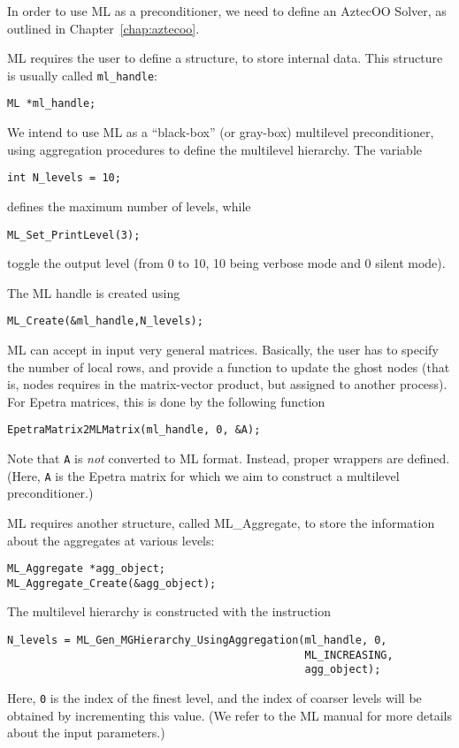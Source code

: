 In order to use ML as a preconditioner, we need to define an
AztecOO Solver, as outlined in Chapter~\ref{chap:aztecoo}. 

ML requires the user to define a structure, to store internal data. This
structure is usually called \verb!ml_handle!:
\begin{verbatim}
ML *ml_handle;
\end{verbatim}

We intend to use ML as a ``black-box'' (or gray-box) multilevel
preconditioner, using aggregation procedures to define the multilevel
hierarchy. The variable
\begin{verbatim}
int N_levels = 10;
\end{verbatim}
defines the maximum number of levels, while
\begin{verbatim}
ML_Set_PrintLevel(3);
\end{verbatim}
toggle the output level (from 0 to 10, 10 being verbose mode and 0
silent mode).

The ML handle is created using
\begin{verbatim}
ML_Create(&ml_handle,N_levels);
\end{verbatim}
ML can accept in input very general matrices. Basically, the user has to
specify the number of local rows, and provide a function to update the
ghost nodes (that is, nodes requires in the matrix-vector product, but
assigned to another process). For Epetra matrices, this is done by the
following function
\begin{verbatim}
EpetraMatrix2MLMatrix(ml_handle, 0, &A);
\end{verbatim}
Note that \verb!A! is {\sl not} converted to ML format. Instead, proper
wrappers are defined.  (Here, \verb!A! is the Epetra matrix for which we
aim to construct a multilevel preconditioner.)

ML requires another structure, called ML\_Aggregate, to store the
information about the aggregates at various levels:
\begin{verbatim}
ML_Aggregate *agg_object;
ML_Aggregate_Create(&agg_object);
\end{verbatim}

The multilevel hierarchy is constructed with the instruction
\begin{verbatim}
N_levels = ML_Gen_MGHierarchy_UsingAggregation(ml_handle, 0,
                                               ML_INCREASING,
                                               agg_object);
\end{verbatim}
Here, \verb!0! is the index of the finest level, and the index of
coarser levels will be obtained by incrementing this value.  (We refer
to the ML manual for more details about the input parameters.)

